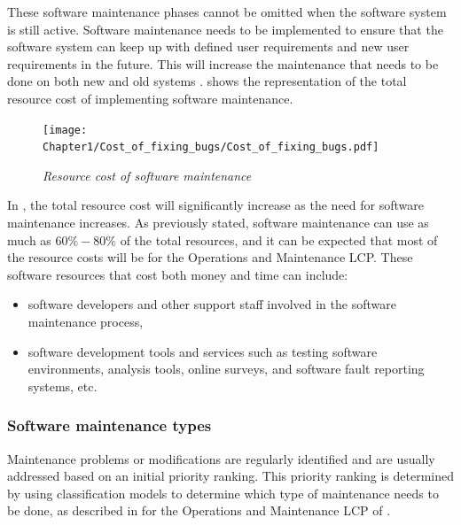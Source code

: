 These software maintenance phases cannot be omitted when the software system is still active. Software maintenance needs to be implemented to ensure that the software system can keep up with defined user requirements and new user requirements in the future. This will increase the maintenance that needs to be done on both new and old systems \cite{Niu2018, Galster2019, Hasan2012}.  shows the representation of the total resource cost of implementing software maintenance.

\begin{figure}[!htb]
	\centering %
	\texttt{[image: Chapter1/Cost\_of\_fixing\_bugs/Cost\_of\_fixing\_bugs.pdf]}
	\caption[Resource cost of software maintenance]
	{\textit{Resource cost of software maintenance \cite{Ogheneovo2014}}}\label{fig:ch1_costsOfFixingBugs}
\end{figure}

In , the total resource cost will significantly increase as the need for software maintenance increases. As previously stated, software maintenance can use as much as $60\%-80\%$ of the total resources, and it can be expected that most of the resource costs will be for the Operations and Maintenance LCP. These software resources that cost both money and time can include:

\begin{itemize}
	\item software developers and other support staff involved in the software maintenance process,
	\item software development tools and services such as testing software environments, analysis tools, online surveys, and software fault reporting systems, etc.
\end{itemize}

\subsubsection{Software maintenance types}

Maintenance problems or modifications are regularly identified and are usually addressed based on an initial priority ranking. This priority ranking is determined by using classification models to determine which type of maintenance needs to be done, as described in  for the Operations and Maintenance LCP of  \cite{Tang2010, Ping2010}.

